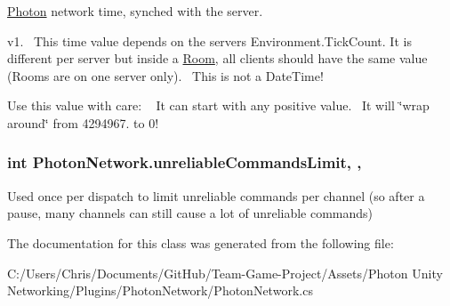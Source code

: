 \hyperlink{namespace_photon}{Photon} network time, synched with the server. 

v1.~\newline
 This time value depends on the server\textquotesingle{}s Environment.\+Tick\+Count. It is different per server but inside a \hyperlink{class_room}{Room}, all clients should have the same value (Rooms are on one server only).~\newline
 This is not a Date\+Time!~\newline


Use this value with care\+: ~\newline
 It can start with any positive value.~\newline
 It will \char`\"{}wrap around\char`\"{} from 4294967. to 0! 
\subsubsection[{\texorpdfstring{unreliable\+Commands\+Limit}{unreliableCommandsLimit}}]{\setlength{\rightskip}{0pt plus 5cm}int Photon\+Network.\+unreliable\+Commands\+Limit\hspace{0.3cm}{\ttfamily [static]}, {\ttfamily [get]}, {\ttfamily [set]}}\hypertarget{class_photon_network_a3315be88f62dbdc24819946fc6171e08}{}\label{class_photon_network_a3315be88f62dbdc24819946fc6171e08}


Used once per dispatch to limit unreliable commands per channel (so after a pause, many channels can still cause a lot of unreliable commands) 



The documentation for this class was generated from the following file\+:\begin{DoxyCompactItemize}
\item 
C\+:/\+Users/\+Chris/\+Documents/\+Git\+Hub/\+Team-\/\+Game-\/\+Project/\+Assets/\+Photon Unity Networking/\+Plugins/\+Photon\+Network/Photon\+Network.\+cs\end{DoxyCompactItemize}
